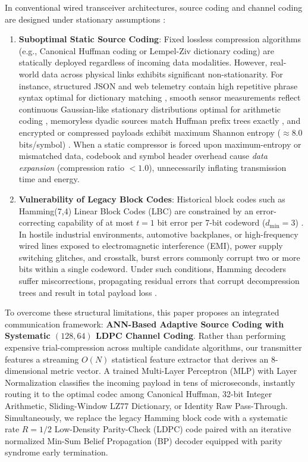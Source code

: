 \documentclass[conference]{IEEEtran}
\begin{document}
In conventional wired transceiver architectures, source coding and channel coding are designed under stationary assumptions \cite{cover2006}:
\begin{enumerate}
    \item \textbf{Suboptimal Static Source Coding}: Fixed lossless compression algorithms (e.g., Canonical Huffman coding or Lempel-Ziv dictionary coding) are statically deployed regardless of incoming data modalities. However, real-world data across physical links exhibits significant non-stationarity. For instance, structured JSON and web telemetry contain high repetitive phrase syntax optimal for dictionary matching \cite{ziv1977}, smooth sensor measurements reflect continuous Gaussian-like stationary distributions optimal for arithmetic coding \cite{witten1987,rissanen1979}, memoryless dyadic sources match Huffman prefix trees exactly \cite{huffman1952}, and encrypted or compressed payloads exhibit maximum Shannon entropy ($\approx 8.0$ bits/symbol) \cite{shannon1948}. When a static compressor is forced upon maximum-entropy or mismatched data, codebook and symbol header overhead cause \textit{data expansion} (compression ratio $< 1.0$), unnecessarily inflating transmission time and energy.
    
    \item \textbf{Vulnerability of Legacy Block Codes}: Historical block codes such as Hamming(7,4) Linear Block Codes (LBC) are constrained by an error-correcting capability of at most $t=1$ bit error per 7-bit codeword ($d_{\min}=3$) \cite{hamming1950,lin2004}. In hostile industrial environments, automotive backplanes, or high-frequency wired lines exposed to electromagnetic interference (EMI), power supply switching glitches, and crosstalk, burst errors commonly corrupt two or more bits within a single codeword. Under such conditions, Hamming decoders suffer miscorrections, propagating residual errors that corrupt decompression trees and result in total payload loss \cite{richardson2008}.
\end{enumerate}

To overcome these structural limitations, this paper proposes an integrated communication framework: \textbf{ANN-Based Adaptive Source Coding with Systematic $(128, 64)$ LDPC Channel Coding}. Rather than performing expensive trial-compression across multiple candidate algorithms, our transmitter features a streaming $O(N)$ statistical feature extractor that derives an $8$-dimensional metric vector. A trained Multi-Layer Perceptron (MLP) with Layer Normalization classifies the incoming payload in tens of microseconds, instantly routing it to the optimal codec among Canonical Huffman, 32-bit Integer Arithmetic, Sliding-Window LZ77 Dictionary, or Identity Raw Pass-Through. Simultaneously, we replace the legacy Hamming block code with a systematic rate $R=1/2$ Low-Density Parity-Check (LDPC) code \cite{gallager1962,richardson2001} paired with an iterative normalized Min-Sum Belief Propagation (BP) decoder \cite{chen2005,fossorier1999} equipped with parity syndrome early termination.
\end{document}
